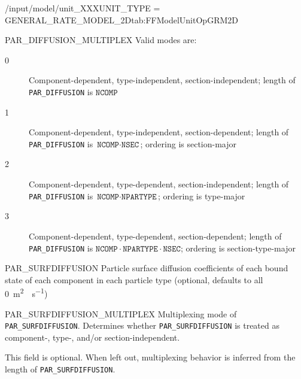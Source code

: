 \begin{condsubgroup}{/input/model/unit\_XXX}{UNIT\_TYPE = GENERAL\_RATE\_MODEL\_2D}{tab:FFModelUnitOpGRM2D}
\begin{dataset}[unit=--,type=int,range={$\{0, \dots, 3 \}$},length={1}]{PAR\_DIFFUSION\_MULTIPLEX}
    Valid modes are:
    \begin{description}
      \item[0] Component-dependent, type-independent, section-independent; length of \texttt{PAR\_DIFFUSION} is $\texttt{NCOMP}$
      \item[1] Component-dependent, type-independent, section-dependent; length of \texttt{PAR\_DIFFUSION} is $\texttt{NCOMP} \cdot \texttt{NSEC}$; ordering is section-major
      \item[2] Component-dependent, type-dependent, section-independent; length of \texttt{PAR\_DIFFUSION} is $\texttt{NCOMP} \cdot \texttt{NPARTYPE}$; ordering is type-major
      \item[3] Component-dependent, type-dependent, section-dependent; length of \texttt{PAR\_DIFFUSION} is $\texttt{NCOMP} \cdot \texttt{NPARTYPE} \cdot \texttt{NSEC}$; ordering is section-type-major
    \end{description}\vspace{-\baselineskip}
  \end{dataset}
  \begin{dataset}[unit=\si{\square\metre\of{SP}\per\second},type=double,range={$\geq 0$},length={see \texttt{PAR\_SURFDIFFUSION\_MULTIPLEX}}]{PAR\_SURFDIFFUSION}
    Particle surface diffusion coefficients of each bound state of each component in each particle type (optional, defaults to all \SI{0}{\square\metre{}\per\second})
  \end{dataset}
  \begin{dataset}[unit=--,type=int,range={$\{0, \dots, 3 \}$},length={1}]{PAR\_SURFDIFFUSION\_MULTIPLEX}
    Multiplexing mode of \texttt{PAR\_SURFDIFFUSION}.
    Determines whether \texttt{PAR\_SURFDIFFUSION} is treated as component-, type-, and/or section-independent.

    This field is optional.
    When left out, multiplexing behavior is inferred from the length of \texttt{PAR\_SURFDIFFUSION}.


\end{dataset}
\end{condsubgroup}
